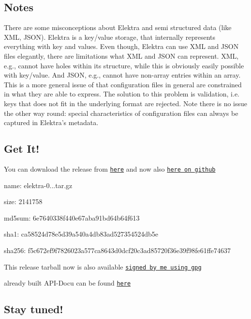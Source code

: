 \subsection*{Notes}

There are some misconceptions about Elektra and semi structured data (like X\+M\+L, J\+S\+O\+N). Elektra is a key/value storage, that internally represents everything with key and values. Even though, Elektra can use X\+M\+L and J\+S\+O\+N files elegantly, there are limitations what X\+M\+L and J\+S\+O\+N can represent. X\+M\+L, e.\+g., cannot have holes within its structure, while this is obviously easily possible with key/value. And J\+S\+O\+N, e.\+g., cannot have non-\/array entries within an array. This is a more general issue of that configuration files in general are constrained in what they are able to express. The solution to this problem is validation, i.\+e. keys that does not fit in the underlying format are rejected. Note there is no issue the other way round\+: special characteristics of configuration files can always be captured in Elektra's metadata.

\subsection*{Get It!}

You can download the release from \href{http://www.libelektra.org/ftp/elektra/releases/elektra-0.8.13.tar.gz}{\tt here} and now also \href{https://github.com/ElektraInitiative/ftp/tree/master/releases/elektra-0.8.13.tar.gz}{\tt here on github}


\begin{DoxyItemize}
\item name\+: elektra-\/0...\+tar.\+gz
\item size\+: 2141758
\item md5sum\+: 6e7640338f440e67aba91bd64b64f613
\item sha1\+: ca58524d78e5d39a540a4db83ad527354524db5e
\item sha256\+: f5c672ef9f7826023a577ca8643d0dcf20c3ad85720f36e39f98fe61ffe74637
\end{DoxyItemize}

This release tarball now is also available \href{http://www.libelektra.org/ftp/elektra/releases/elektra-0.8.13.tar.gz.gpg}{\tt signed by me using gpg}

already built A\+P\+I-\/\+Docu can be found \href{http://doc.libelektra.org/api/0.8.13/html/}{\tt here}

\subsection*{Stay tuned!}

